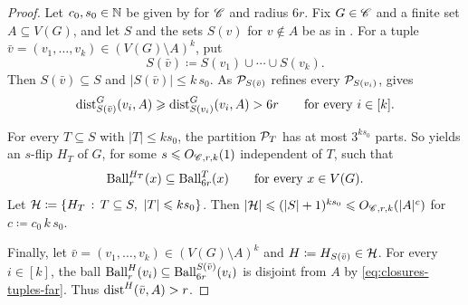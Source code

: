 \begin{proof}
    Let $c_0,s_0\in\mathbb N$ be given by  for $\mathscr C$ and radius $6r$.
    Fix $G\in\mathscr C$ and a finite set $A\subseteq V(G)$, and let $S$ and the sets $S(v)$ for $v\notin A$ be as in .
    For a tuple $\bar v=(v_1,\ldots,v_k)\in(V(G)\setminus A)^k$, put
    \[
        S(\bar v)\coloneqq S(v_1)\cup\cdots\cup S(v_k).
    \]
    Then $S(\bar v)\subseteq S$ and $|S(\bar v)|\leq k\,s_0$.
    As $\mathcal P_{S(\bar v)}$ refines every $\mathcal P_{S(v_i)}$,  gives
    \begin{equation}\label{eq:closures-tuples-far}
        \mathrm{dist}_{S(\bar v)}^G(v_i,A)\geqslant\mathrm{dist}_{S(v_i)}^G(v_i,A)>6r
        \qquad\text{for every }i\in[k].
    \end{equation}

    For every $T\subseteq S$ with $|T|\leq ks_0$, the partition $\mathcal P_T$ has at most $3^{ks_0}$ parts.
    So  yields an $s$-flip $H_T$ of $G$, for some $s\leqslant O_{\mathscr C,r,k}(1)$ independent of $T$, such that
    \[
        \operatorname{Ball}^{H_T}_r(x)\subseteq\operatorname{Ball}^{T}_{6r}(x)
        \qquad\text{for every }x\in V(G).
    \]
    Let $\mathcal H\coloneqq\{H_T \,:\, T\subseteq S,\ |T|\leqslant ks_0\}$.
    Then $|\mathcal H|\leqslant(|S|+1)^{ks_0}\leqslant O_{\mathscr C,r,k}(|A|^{c})$ for $c\coloneqq c_0\, k\, s_0$.

    Finally, let $\bar v=(v_1,\ldots,v_k)\in(V(G)\setminus A)^k$ and $H\coloneqq H_{S(\bar v)}\in\mathcal H$.
    For every $i\in[k]$, the ball $\operatorname{Ball}^H_r(v_i)\subseteq\operatorname{Ball}^{S(\bar v)}_{6r}(v_i)$ is disjoint from $A$ by \eqref{eq:closures-tuples-far}.
    Thus $\mathrm{dist}^H(\bar v,A)>r$.
\end{proof}
